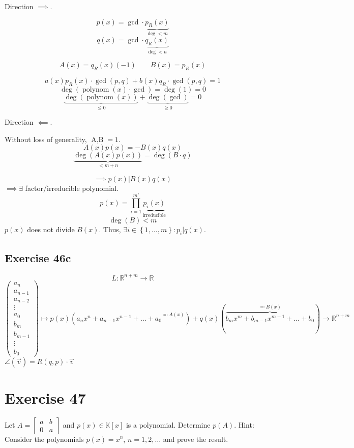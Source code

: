 \documentclass[a4paper]{article}
\theoremstyle{definition}
\newcommand\set[1]{\left\{#1\right\}}
\begin{document}
Direction $\implies$.

\[ p(x) = \operatorname{gcd} \cdot \underbrace{p_R(x)}_{\deg < m} \]
\[ q(x) = \operatorname{gcd} \cdot \underbrace{q_R(x)}_{\deg < n} \]

\[ A(x) = q_R(x)(-1) \qquad B(x) = p_R(x) \]

\[ a(x) p_R(x) \cdot \operatorname{gcd}(p, q) + b(x) q_R \cdot \operatorname{gcd}(p, q) = 1 \]
\[ \deg(\operatorname{polynom}(x) \cdot \operatorname{gcd}) = \deg(1) = 0 \]
\[ \underbrace{\deg(\operatorname{polynom}(x))}_{\leq 0} + \underbrace{\deg(\operatorname{gcd})}_{\geq 0} = 0 \]

Direction $\impliedby$.

Without loss of generality, $\operatorname{A, B} = 1$.
\[ A(x) p(x) = -B(x) q(x) \]
\[ \underbrace{\deg(A(x) p(x))}_{< m + n} = \deg(B \cdot q) \]

\[ \implies p(x) | B(x) q(x) \]
$\implies \exists$ factor/irreducible polynomial.
\[ p(x) = \prod_{i=1}^{m'} \underbrace{p_i(x)}_{\text{irreducible}} \]
\[ \deg(B) < m \]
$p(x)$ does not divide $B(x)$. Thus, $\exists i \in \set{1, \dots, m}: p_i | q(x)$.

\subsection{Exercise 46c}

\[ L: \mathbb R^{n + m} \to \mathbb R \]
\[ \begin{pmatrix} a_n \\ a_{n-1} \\ a_{n-2} \\ \vdots \\ a_0 \\ b_m \\ b_{m-1} \\ \vdots \\ b_0 \end{pmatrix} \mapsto p(x) ({a_n x^n + a_{n-1} x^{n-1} + \dots + a_0}^{\eqqcolon A(x)}) + q(x) (\overbrace{b_m x^m + b_{m-1} x^{m-1} + \dots + b_0}^{\eqqcolon B(x)}) \to \mathbb R^{n + m} \]
$\angle(\vec v) = R(q, p) \cdot \vec v$

\section{Exercise 47}
\begin{ex}
  Let $A = \begin{bmatrix} a & b \\ 0 & a \end{bmatrix}$ and $p(x) \in \mathbb K[x]$ is a polynomial.
  Determine $p(A)$. Hint: Consider the polynomials $p(x) = x^n$, $n = 1, 2, \dots$ and prove the result.
\end{ex}
\end{document}
